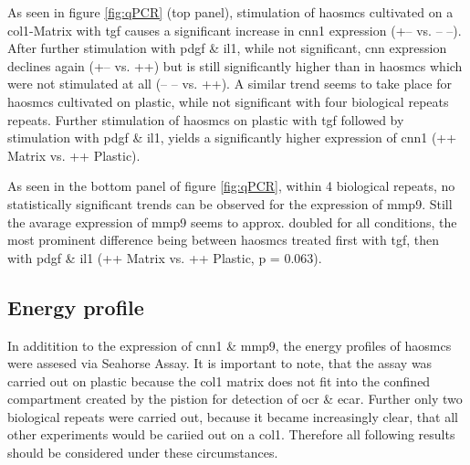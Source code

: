     As seen in figure \ref{fig:qPCR} (top panel), stimulation of \acp{haosmc} cultivated on a \ac{col1}-Matrix with \ac{tgf} causes a significant increase in \ac{cnn1} expression (+– vs. – –). After further stimulation with \ac{pdgf} \& \ac{il1}, while not significant, \ac{cnn} expression declines again (+– vs. ++) but is still significantly higher than in \acp{haosmc} which were not stimulated at all (– – vs. ++). A similar trend seems to take place for \acp{haosmc} cultivated on plastic, while not significant with four biological repeats repeats. Further stimulation of \acp{haosmc} on plastic with \ac{tgf} followed by stimulation with \ac{pdgf} \& \ac{il1}, yields a significantly higher expression of \ac{cnn1} (++ Matrix vs. ++ Plastic).

    As seen in the bottom panel of figure \ref{fig:qPCR}, within 4 biological repeats, no statistically significant trends can be observed for the expression of \ac{mmp9}. Still the avarage expression of \ac{mmp9} seems to approx. doubled for all conditions, the most prominent difference being between \acp{haosmc} treated first with \ac{tgf}, then with \ac{pdgf} \& \ac{il1} (++ Matrix vs. ++ Plastic, p = 0.063).


    \subsection{Energy profile}
    \label{subsec:energy}
    In additition to the expression of \ac{cnn1} \& \ac{mmp9}, the energy profiles of \acp{haosmc} were assesed via Seahorse Assay. It is important to note, that the assay was carried out on plastic because the \ac{col1} matrix does not fit into the confined compartment created by the pistion for detection of \ac{ocr} \& \ac{ecar}. Further only two biological repeats were carried out, because it became increasingly clear, that all other experiments would be cariied out on a \ac{col1}. Therefore all following results should be considered under these circumstances.

